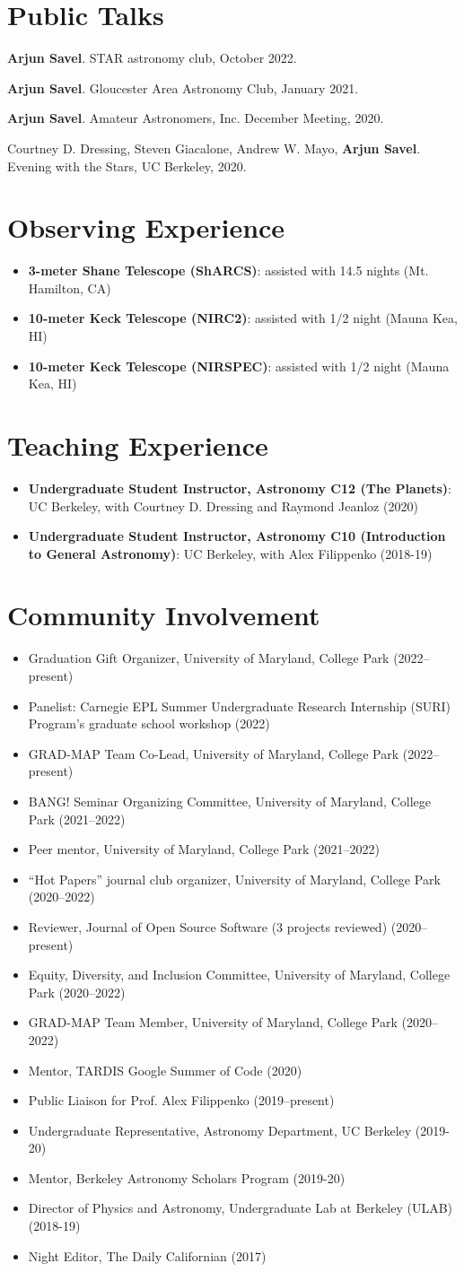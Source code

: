 \documentclass[letterpaper,10.5pt]{article}
\newcommand{\resumeItem}[2]{
  \item\small{
    \textbf{#1}{#2 \vspace{-2pt}}
  }
}
\newcommand{\resumeItemNoBullet}[2]{
  \item[]\small{
    \hspace{-9pt}\textbf{#1}{: #2 \vspace{-6pt}}
  }
}
\newcommand{\resumeSubHeadingListEnd}{\end{itemize}}
\newcommand{\resumeItemListStart}{\begin{itemize}}
\newcommand{\resumeItemListEnd}{\end{itemize}\vspace{-5pt}}
\newcommand{\shorterSection}[1]{\vspace{-10pt}\section{#1}}
\begin{document}
\shorterSection{Public Talks}
\begin{list}{}{\cvlist}
\item[{\color{numcolor}\scriptsize4}] \textbf{Arjun Savel}. STAR astronomy club, October 2022.
\item[{\color{numcolor}\scriptsize3}] \textbf{Arjun Savel}. Gloucester Area Astronomy Club, January 2021.
\item[{\color{numcolor}\scriptsize2}] \textbf{Arjun Savel}. Amateur Astronomers, Inc. December Meeting, 2020.
\item[{\color{numcolor}\scriptsize1}] Courtney D. Dressing, Steven Giacalone, Andrew W. Mayo, \textbf{Arjun Savel}. Evening with the Stars, UC Berkeley, 2020.
\end{list}

\shorterSection{Observing Experience}
\resumeItemListStart
\resumeItemNoBullet{3-meter Shane Telescope (ShARCS)}{assisted with 14.5 nights (Mt. Hamilton, CA)}
\resumeItemNoBullet{10-meter Keck Telescope (NIRC2)}{assisted with 1/2 night (Mauna Kea, HI)}
\resumeItemNoBullet{10-meter Keck Telescope (NIRSPEC)}{assisted with 1/2 night (Mauna Kea, HI)}

\resumeSubHeadingListEnd

\shorterSection{Teaching Experience}
\resumeItemListStart
\resumeItemNoBullet{Undergraduate Student Instructor, Astronomy C12 (The Planets)}{UC Berkeley, with Courtney D. Dressing and Raymond Jeanloz (2020)}
\resumeItemNoBullet{Undergraduate Student Instructor, Astronomy C10 (Introduction to General Astronomy)}{UC Berkeley, with Alex Filippenko (2018-19)}
\resumeSubHeadingListEnd


\shorterSection{Community Involvement}
\resumeItemListStart
\resumeItem{}{Graduation Gift Organizer, University of Maryland, College Park (2022--present)}
\resumeItem{}{Panelist: Carnegie EPL Summer Undergraduate Research Internship (SURI) Program’s graduate school workshop (2022)}
\resumeItem{}{GRAD-MAP Team Co-Lead, University of Maryland, College Park (2022--present)}
\resumeItem{}{BANG! Seminar Organizing Committee, University of Maryland, College Park (2021--2022)}
\resumeItem{}{Peer mentor, University of Maryland, College Park (2021--2022)}
\resumeItem{}{``Hot Papers'' journal club organizer, University of Maryland, College Park (2020--2022)}
\resumeItem{}{Reviewer, Journal of Open Source Software (3 projects reviewed) (2020--present)}
\resumeItem{}{Equity, Diversity, and Inclusion Committee, University of Maryland, College Park (2020--2022)}
\resumeItem{}{GRAD-MAP Team Member, University of Maryland, College Park (2020--2022)}
\resumeItem{}{Mentor, TARDIS Google Summer of Code (2020)}
\resumeItem{}{Public Liaison for Prof. Alex Filippenko (2019--present)}
\resumeItem{}{Undergraduate Representative, Astronomy Department, UC Berkeley (2019-20)}
\resumeItem{}{Mentor, Berkeley Astronomy Scholars Program (2019-20)}
\resumeItem{}{Director of Physics and Astronomy, Undergraduate Lab at Berkeley (ULAB) (2018-19)}
\resumeItem{}{Night Editor, The Daily Californian (2017)}
\resumeItemListEnd
\end{document}
